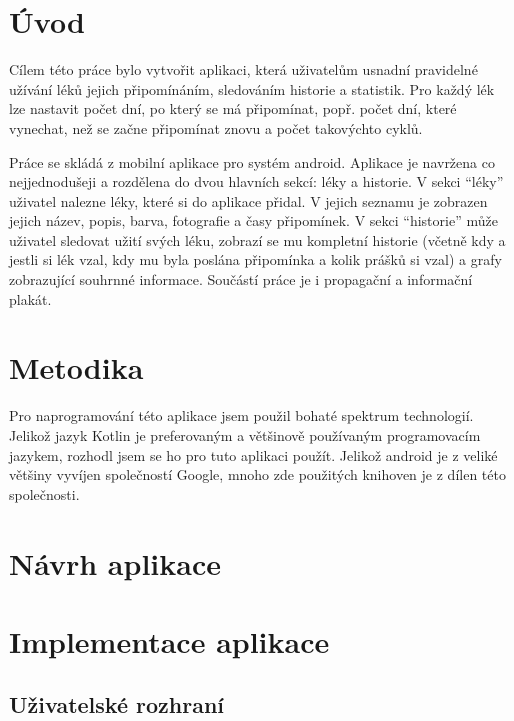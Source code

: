 \documentclass[a4paper,12pt]{report}
\begin{document}

\renewcommand\cftsecafterpnum{\vskip10pt}
\renewcommand\cftsubsecafterpnum{\vskip10pt}
\renewcommand\cftsubsubsecafterpnum{\vskip10pt}
\newpage
\tableofcontents %

\chapter*{Úvod}

Cílem této práce bylo vytvořit aplikaci, která uživatelům usnadní pravidelné užívání léků jejich připomínáním, sledováním historie a statistik. Pro každý lék lze nastavit počet dní, po který se má připomínat, popř. počet dní, které vynechat, než se začne připomínat znovu a počet takovýchto cyklů.

Práce se skládá z mobilní aplikace pro systém android. Aplikace je navržena co nejjednodušeji a rozdělena do dvou hlavních sekcí: léky a historie. V sekci \enquote{léky} uživatel nalezne léky, které si do aplikace přidal. V jejich seznamu je zobrazen jejich název, popis, barva, fotografie a časy připomínek. V sekci \enquote{historie} může uživatel sledovat užití svých léku, zobrazí se mu kompletní historie (včetně kdy a jestli si lék vzal, kdy mu byla poslána připomínka a kolik prášků si vzal) a grafy zobrazující souhrnné informace. Součástí práce je i propagační a informační plakát. 




\chapter{Metodika}

Pro naprogramování této aplikace jsem použil bohaté spektrum technologií. Jelikož jazyk Kotlin je preferovaným a většinově používaným programovacím jazykem, rozhodl jsem se ho pro tuto aplikaci použít. Jelikož android je z veliké většiny vyvíjen společností Google, mnoho zde použitých knihoven je z dílen této společnosti.

\chapter{Návrh aplikace}
\chapter{Implementace aplikace}
\section{Uživatelské rozhraní}
\end{document}
